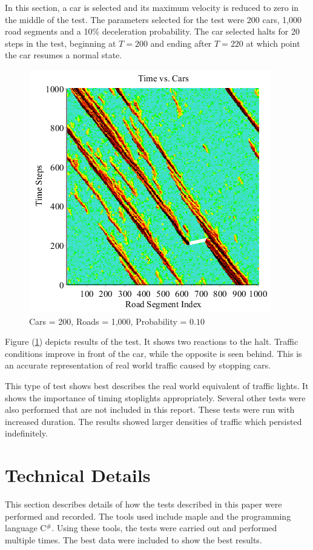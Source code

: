 \documentclass[12pt]{extarticle}
\begin{document}
In this section, a car is selected and its maximum velocity is reduced to zero in the middle of the test. The parameters selected for the test were 200 cars, 1,000 road segments and a 10\% deceleration probability. The car selected halts for 20 steps in the test, beginning at $T=200$ and ending after $T=220$ at which point the car resumes a normal state.
\begin{figure}
	\includegraphics[scale=0.50]{Graph8.png}
	\caption{Cars = 200, Roads = 1,000, \newline Probability = $0.10$}
	\label{fig:img8}
\end{figure}
Figure (\ref{fig:img8}) depicts results of the test. It shows two reactions to the halt. Traffic conditions improve in front of the car, while the opposite is seen behind. This is an accurate representation of real world traffic caused by stopping cars.

This type of test shows best describes the real world equivalent of traffic lights. It shows the importance of timing stoplights appropriately. Several other tests were also performed that are not included in this report. These tests were run with increased duration. The results showed larger densities of traffic which persisted indefinitely.

\section{Technical Details}

This section describes details of how the tests described in this paper were performed and recorded. The tools used include maple and the programming language C$^\#$. Using these tools, the tests were carried out and performed multiple times. The best data were included to show the best results. 
\end{document}
